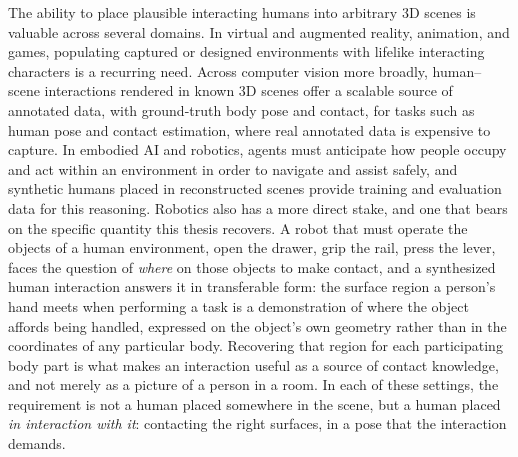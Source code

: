 The ability to place plausible interacting humans into arbitrary 3D scenes is valuable across several domains. In virtual and augmented reality, animation, and games, populating captured or designed environments with lifelike interacting characters is a recurring need. Across computer vision more broadly, human--scene interactions rendered in known 3D scenes offer a scalable source of annotated data, with ground-truth body pose and contact, for tasks such as human pose and contact estimation, where real annotated data is expensive to capture. In embodied AI and robotics, agents must anticipate how people occupy and act within an environment in order to navigate and assist safely, and synthetic humans placed in reconstructed scenes provide training and evaluation data for this reasoning. Robotics also has a more direct stake, and one that bears on the specific quantity this thesis recovers. A robot that must operate the objects of a human environment, open the drawer, grip the rail, press the lever, faces the question of \emph{where} on those objects to make contact, and a synthesized human interaction answers it in transferable form: the surface region a person's hand meets when performing a task is a demonstration of where the object affords being handled, expressed on the object's own geometry rather than in the coordinates of any particular body. Recovering that region for each participating body part is what makes an interaction useful as a source of contact knowledge, and not merely as a picture of a person in a room. In each of these settings, the requirement is not a human placed somewhere in the scene, but a human placed \emph{in interaction with it}: contacting the right surfaces, in a pose that the interaction demands.

